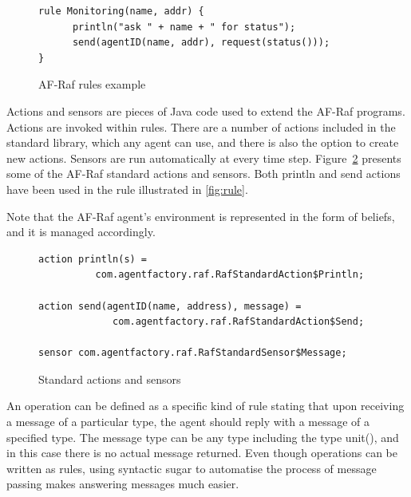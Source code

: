 \documentclass[a4paper,12pt,oneside,fleqn]{book} %
\begin{document}


\begin{figure}\footnotesize %
\begin{verbatim}
rule Monitoring(name, addr) {
      println("ask " + name + " for status");
      send(agentID(name, addr), request(status()));
}
\end{verbatim}
\caption{AF-Raf rules example}
\label{fig:rule}
\end{figure} %

Actions and sensors are pieces of Java code used to extend the AF-Raf
programs. Actions are invoked within rules. There are a number of actions
included in the standard library, which any agent can use, and there is also
the option to create new actions. Sensors are run automatically at every time
step. Figure~\ref{fig:actions-sensors} presents some of the AF-Raf standard
actions and sensors. Both {\sf println} and {\sf send} actions have been
used in the rule illustrated in \autoref{fig:rule}.

Note that the AF-Raf agent's environment is represented in the form of
beliefs, and it is managed accordingly.

\begin{figure}\footnotesize %
\begin{verbatim}
action println(s) =
          com.agentfactory.raf.RafStandardAction$Println;

action send(agentID(name, address), message) =
             com.agentfactory.raf.RafStandardAction$Send;

sensor com.agentfactory.raf.RafStandardSensor$Message;
\end{verbatim}
\caption{Standard actions and sensors}
\label{fig:actions-sensors}
\end{figure} %


An operation can be defined as a specific kind of rule stating that upon
receiving a message of a particular type, the agent should reply with a
message of a specified type. The message type can be any type including the
type unit(), and in this case there is no actual message returned. Even
though operations can be written as rules, using syntactic sugar to
automatise the process of message passing makes answering messages much
easier.
\end{document}
